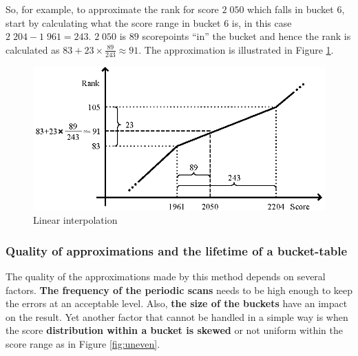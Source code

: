 \newpage
So, for example, to approximate the rank for score $2\;050$ which falls in bucket 6, start by calculating what the score range in bucket 6 is, in this case $2\;204 - 1\;961 = 243$. $2\;050$ is $89$ scorepoints ``in'' the bucket and hence the rank is calculated as $83 + 23 \times \frac{89}{243} \approx 91$. The approximation is illustrated in Figure \ref{fig:linear}.


\begin{figure}[h!]
  \centering
  \caption{Linear interpolation}
  \label{fig:linear}
  \includegraphics[width=13cm]{img/linear_interpolation.eps}
\end{figure}

\subsubsection{Quality of approximations and the lifetime of a bucket-table}

The quality of the approximations made by this method depends on several factors.
\textbf{The frequency of the periodic scans} needs to be high enough to keep the errors at an acceptable level. Also, \textbf{the size of the buckets} have an impact on the result. Yet another factor that cannot be handled in a simple way is when the score \textbf{distribution within a bucket is skewed} or not uniform within the score range as in Figure \ref{fig:uneven}.

